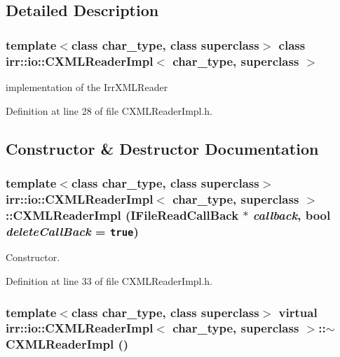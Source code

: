 \subsection{Detailed Description}
\subsubsection*{template$<$class char\_\-type, class superclass$>$ class irr::io::CXMLReaderImpl$<$ char\_\-type, superclass $>$}

implementation of the IrrXMLReader 

Definition at line 28 of file CXMLReaderImpl.h.

\subsection{Constructor \& Destructor Documentation}
\hypertarget{classirr_1_1io_1_1_c_x_m_l_reader_impl_0566f930b8accdcdd4714f4b850f8a76}{
\subsubsection[{CXMLReaderImpl}]{\setlength{\rightskip}{0pt plus 5cm}template$<$class char\_\-type, class superclass$>$ {\bf irr::io::CXMLReaderImpl}$<$ char\_\-type, {\bf superclass} $>$::{\bf CXMLReaderImpl} ({\bf IFileReadCallBack} $\ast$ {\em callback}, \/  bool {\em deleteCallBack} = {\tt true})}}
\label{classirr_1_1io_1_1_c_x_m_l_reader_impl_0566f930b8accdcdd4714f4b850f8a76}


Constructor. 



Definition at line 33 of file CXMLReaderImpl.h.\hypertarget{classirr_1_1io_1_1_c_x_m_l_reader_impl_5306b209d836775bc2c5c286314c7e20}{
\subsubsection[{$\sim$CXMLReaderImpl}]{\setlength{\rightskip}{0pt plus 5cm}template$<$class char\_\-type, class superclass$>$ virtual {\bf irr::io::CXMLReaderImpl}$<$ char\_\-type, {\bf superclass} $>$::$\sim${\bf CXMLReaderImpl} ()}}
\label{classirr_1_1io_1_1_c_x_m_l_reader_impl_5306b209d836775bc2c5c286314c7e20}


